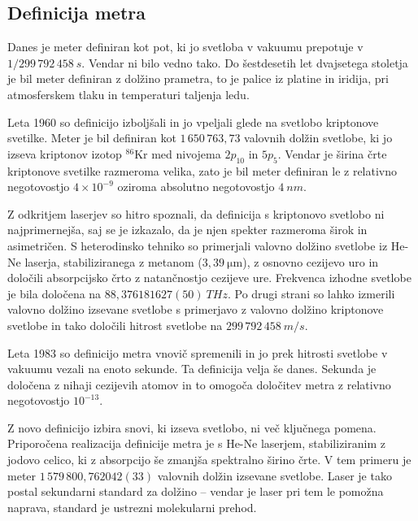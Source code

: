 \subsection*{Definicija metra}
Danes je meter definiran kot pot, ki jo svetloba v 
vakuumu prepotuje v 
$1/299\,792\,458~\si{s}$.  Vendar ni bilo vedno tako. Do šestdesetih let dvajsetega
stoletja je bil meter definiran z dolžino prametra, to je palice iz platine in iridija, 
pri atmosferskem tlaku in temperaturi taljenja ledu. 

Leta 1960 so definicijo 
izboljšali in jo vpeljali glede na svetlobo kriptonove svetilke. Meter je bil 
definiran kot $1\,650\, 763,73$ valovnih dolžin svetlobe, ki jo izseva kriptonov
izotop $^{86}$Kr med nivojema $2p_{10}$ in $5p_5$. Vendar je širina črte
kriptonove svetilke razmeroma velika, zato je bil meter 
definiran le z relativno negotovostjo $4 \times 10^{-9}$ oziroma absolutno 
negotovostjo $4~\si{nm}$. 

Z odkritjem laserjev so hitro spoznali, da definicija s kriptonovo svetlobo ni 
najprimernejša, saj se je izkazalo, da je njen spekter razmeroma širok in asimetričen. 
S heterodinsko tehniko so primerjali valovno dolžino 
svetlobe 
iz He-Ne laserja, stabiliziranega z metanom ($3,39~\si{\micro\meter}$), z osnovno
cezijevo uro in določili absorpcijsko črto z natančnostjo cezijeve ure.
Frekvenca izhodne svetlobe je bila določena na $88,376181627(50)~\si{THz}$.
Po drugi strani so lahko izmerili valovno dolžino izsevane svetlobe s primerjavo 
z valovno dolžino kriptonove svetlobe in tako določili hitrost svetlobe na
$299\, 792\, 458~\si{m/s}$.

Leta 1983 so definicijo metra vnovič spremenili in jo prek hitrosti svetlobe v
vakuumu vezali na enoto sekunde. Ta definicija velja še danes. Sekunda je določena
z nihaji cezijevih atomov in to omogoča določitev metra z relativno 
negotovostjo $10^{-13}$. 

Z novo definicijo izbira snovi, ki izseva svetlobo, ni več ključnega
pomena. Priporočena realizacija definicije metra je s He-Ne laserjem, 
stabiliziranim z jodovo celico, ki z absorpcijo še zmanjša spektralno širino črte.
V tem primeru je meter $1\,579\,800,762042(33)$ valovnih dolžin izsevane svetlobe. 
Laser je tako postal sekundarni standard za dolžino -- vendar je laser pri tem le pomožna 
naprava, standard je ustrezni molekularni prehod. 


